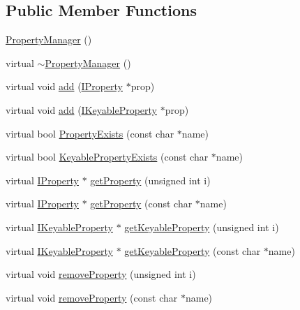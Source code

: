 \subsection*{Public Member Functions}
\begin{DoxyCompactItemize}
\item 
\hyperlink{classmaudio_1_1PropertyManager_ade281312fa768168d5b678332ad00175}{Property\-Manager} ()
\item 
virtual \hyperlink{classmaudio_1_1PropertyManager_a14129700c189235585c2c9ed2d637626}{$\sim$\-Property\-Manager} ()
\item 
virtual void \hyperlink{classmaudio_1_1PropertyManager_a247f345f6b91df3269d0032a7eadc78d}{add} (\hyperlink{classmaudio_1_1IProperty}{I\-Property} $\ast$prop)
\item 
virtual void \hyperlink{classmaudio_1_1PropertyManager_a01820518f68793e5c2f9a2720b962bae}{add} (\hyperlink{classmaudio_1_1IKeyableProperty}{I\-Keyable\-Property} $\ast$prop)
\item 
virtual bool \hyperlink{classmaudio_1_1PropertyManager_a0bb59c88f642ec5d24fa3c1c991378ed}{Property\-Exists} (const char $\ast$name)
\item 
virtual bool \hyperlink{classmaudio_1_1PropertyManager_a2d21e0f5b613771d721d21e35d30dca2}{Keyable\-Property\-Exists} (const char $\ast$name)
\item 
virtual \hyperlink{classmaudio_1_1IProperty}{I\-Property} $\ast$ \hyperlink{classmaudio_1_1PropertyManager_ad2d108b698b9e61f881670a9f5ce5132}{get\-Property} (unsigned int i)
\item 
virtual \hyperlink{classmaudio_1_1IProperty}{I\-Property} $\ast$ \hyperlink{classmaudio_1_1PropertyManager_ab947ffa97971be8b44047d444a99c65f}{get\-Property} (const char $\ast$name)
\item 
virtual \hyperlink{classmaudio_1_1IKeyableProperty}{I\-Keyable\-Property} $\ast$ \hyperlink{classmaudio_1_1PropertyManager_a6e1fe28a2f4d92cde3f3bb0d60ce4666}{get\-Keyable\-Property} (unsigned int i)
\item 
virtual \hyperlink{classmaudio_1_1IKeyableProperty}{I\-Keyable\-Property} $\ast$ \hyperlink{classmaudio_1_1PropertyManager_a5c9dbb27aef129bb1f23fb1d2eca6af3}{get\-Keyable\-Property} (const char $\ast$name)
\item 
virtual void \hyperlink{classmaudio_1_1PropertyManager_aa4dc70e93cf8f59275ed25c1bcaa804c}{remove\-Property} (unsigned int i)
\item 
virtual void \hyperlink{classmaudio_1_1PropertyManager_a737ebb28d24c575ecff05c81556f0ae1}{remove\-Property} (const char $\ast$name)

\end{DoxyCompactItemize}
